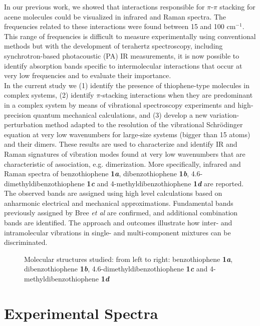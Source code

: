 	In our previous work,\cite{spillebout2014discerning} we showed that interactions responsible for $\pi$-$\pi$ stacking for acene molecules could be visualized in infrared and Raman spectra. The frequencies related to these interactions were found between 15 and 100 cm$^{-1}$. This range of frequencies is difficult to measure experimentally using conventional methods but with the development of terahertz spectroscopy, including synchrotron-based photacoustic (PA) IR measurements, it is now possible to identify absorption bands specific to intermolecular interactions that occur at very low frequencies and to evaluate their importance.\\
	
	In the current study we (1) identify the presence of thiophene-type molecules in complex systems, (2) identify $\pi$-stacking interactions when they are predominant in a complex system by means of vibrational spectroscopy experiments and high-precision quantum mechanical calculations, and (3) develop a new variation-perturbation method adapted to the resolution of the vibrational Schrödinger equation at very low wavenumbers for large-size systems (bigger than 15 atoms) and their dimers. These results are used to characterize and identify IR and Raman signatures of vibration modes found at very low wavenumbers that are characteristic of association, e.g. dimerization. More specifically, infrared and Raman spectra of benzothiophene \textbf{1\textit{a}}, dibenzothiophene \textbf{1\textit{b}}, 4.6-dimethyldibenzothiophene \textbf{1\textit{c}} and 4-methyldibenzothiophene \textbf{1\textit{d}} are reported. The observed bands are assigned using high level calculations based on anharmonic electrical and mechanical approximations. Fundamental bands previously assigned by Bree \textit{et al}\cite{bree1971vibrations} are confirmed, and additional combination bands are identified. The approach and outcomes illustrate how inter- and intramolecular vibrations in single- and multi-component mixtures can be discriminated.
	
	\begin{figure}[H]
		\centering
		\caption{Molecular structures studied:  from left to right: benzothiophene \textbf{1\textit{a}}, dibenzothiophene \textbf{1\textit{b}}, 4.6-dimethyldibenzothiophene \textbf{1\textit{c}} and 4-methyldibenzothiophene \textbf{1\textit{d}}}
	\end{figure}
	
	
	\section{Experimental Spectra}
	
